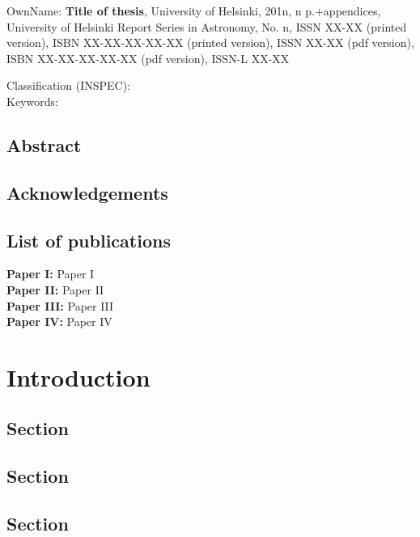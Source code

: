 \documentclass[a4paper,11pt,english]{report}
\newlength{\defbaselineskip}
\newcommand{\setlinespacing}[1]{\setlength{\baselineskip}{#1 \defbaselineskip}}
\begin{document}
\setcounter{page}{1} 
\small
\noindent OwnName: \textbf{Title of thesis}, University of Helsinki, 201n, n
p.$+$appendices, University of Helsinki Report Series in Astronomy, No. n,
ISSN XX-XX (printed version), ISBN XX-XX-XX-XX-XX (printed version),
ISSN XX-XX (pdf version), ISBN XX-XX-XX-XX-XX (pdf version),
ISSN-L XX-XX

\vspace{0.3cm}
\noindent Classification (INSPEC): \\
\noindent Keywords: 

\normalsize
\section*{Abstract}

\newpage
\setlinespacing{1.25}
\section*{Acknowledgements}

\newpage
\section*{List of publications}

\textbf{Paper I:} Paper I \\
\newline
\textbf{Paper II:} Paper II \\
\newline
\textbf{Paper III:} Paper III \\
\newline
\textbf{Paper IV:} Paper IV


\pagestyle{headings}
\tableofcontents

\chapter{Introduction}

\section{Section}
\setcounter{page}{1} 

\section{Section}

\section{Section}
\end{document}
